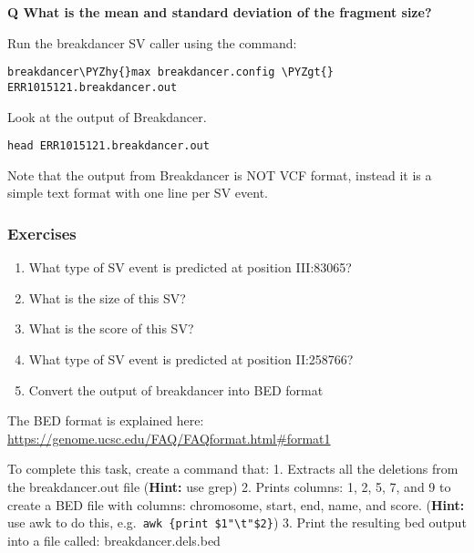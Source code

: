 \documentclass[11pt]{article}
\makeatletter
\def\PYZgt{\char`\>}
\def\PYZhy{\char`\-}
\newcommand{\boxspacing}{\kern\kvtcb@left@rule\kern\kvtcb@boxsep}
\newcommand{\prompt}[4]{
        {\ttfamily\llap{{\color{#2}[#3]:\hspace{3pt}#4}}\vspace{-\baselineskip}}
    }
\makeatother
\begin{document}
    \textbf{Q What is the mean and standard deviation of the fragment size?}

Run the breakdancer SV caller using the command:

    \begin{tcolorbox}[breakable, size=fbox, boxrule=1pt, pad at break*=1mm,colback=cellbackground, colframe=cellborder]
\prompt{In}{incolor}{ }{\boxspacing}
\begin{Verbatim}[commandchars=\\\{\}]
breakdancer\PYZhy{}max breakdancer.config \PYZgt{} ERR1015121.breakdancer.out
\end{Verbatim}
\end{tcolorbox}

    Look at the output of Breakdancer.

    \begin{tcolorbox}[breakable, size=fbox, boxrule=1pt, pad at break*=1mm,colback=cellbackground, colframe=cellborder]
\prompt{In}{incolor}{ }{\boxspacing}
\begin{Verbatim}[commandchars=\\\{\}]
head ERR1015121.breakdancer.out
\end{Verbatim}
\end{tcolorbox}

    Note that the output from Breakdancer is NOT VCF format, instead it is a
simple text format with one line per SV event.

\hypertarget{exercises}{%
\subsubsection{Exercises}\label{exercises}}

\begin{enumerate}
\def\labelenumi{\arabic{enumi}.}
\item
  What type of SV event is predicted at position III:83065?
\item
  What is the size of this SV?
\item
  What is the score of this SV?
\item
  What type of SV event is predicted at position II:258766?
\item
  Convert the output of breakdancer into BED format
\end{enumerate}

    The BED format is explained here:
\url{https://genome.ucsc.edu/FAQ/FAQformat.html\#format1}

To complete this task, create a command that: 1. Extracts all the
deletions from the breakdancer.out file (\textbf{Hint:} use grep) 2.
Prints columns: 1, 2, 5, 7, and 9 to create a BED file with columns:
chromosome, start, end, name, and score. (\textbf{Hint:} use awk to do
this,
e.g.~\texttt{awk\ \textquotesingle{}\{print\ \$1"\textbackslash{}t"\$2\}\textquotesingle{}})
3. Print the resulting bed output into a file called:
breakdancer.dels.bed
\end{document}
